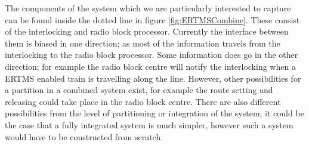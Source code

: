  The components of the system  which we are particularly interested to capture can be found inside the dotted line in figure \ref{fig:ERTMSCombine}. These consist of the interlocking and radio block processor. Currently the interface between them is biased in one direction; as most of the information travels from the interlocking to the radio block processor. Some information does go in the other direction; for example the radio block centre will notify the interlocking when a ERTMS enabled train is travelling along the line.  However, other possibilities for a partition in a combined system exist, for example the route setting and releasing could take place in the radio block centre. There are also different possibilities from the level of partitioning or integration of the system; it could be the case that a fully integrated system is much simpler, however such a system would have to be constructed from scratch. 



